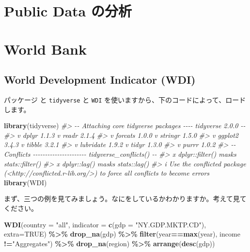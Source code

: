 \documentclass[
  xelatex, ja=standard]{bxjsbook}
\newenvironment{Shaded}{\begin{snugshade}}{\end{snugshade}}
\newcommand{\AttributeTok}[1]{\textcolor[rgb]{0.13,0.29,0.53}{#1}}
\newcommand{\CommentTok}[1]{\textcolor[rgb]{0.56,0.35,0.01}{\textit{#1}}}
\newcommand{\ConstantTok}[1]{\textcolor[rgb]{0.56,0.35,0.01}{#1}}
\newcommand{\FunctionTok}[1]{\textcolor[rgb]{0.13,0.29,0.53}{\textbf{#1}}}
\newcommand{\NormalTok}[1]{#1}
\newcommand{\SpecialCharTok}[1]{\textcolor[rgb]{0.81,0.36,0.00}{\textbf{#1}}}
\newcommand{\StringTok}[1]{\textcolor[rgb]{0.31,0.60,0.02}{#1}}
\theoremstyle{definition}
\theoremstyle{definition}
\theoremstyle{definition}
\theoremstyle{definition}
\theoremstyle{remark}
\begin{document}
\hypertarget{publicdata}{%
\chapter{Public Data の分析}\label{publicdata}}

\hypertarget{worldbank}{%
\chapter{World Bank}\label{worldbank}}

\hypertarget{world-development-indicator-wdi}{%
\section{World Development Indicator (WDI)}\label{world-development-indicator-wdi}}

パッケージ と \texttt{tidyverse} と \texttt{WDI} を使いますから、下のコードによって、ロードします。

\begin{Shaded}
\begin{Highlighting}[]
\FunctionTok{library}\NormalTok{(tidyverse)}
\CommentTok{\#\textgreater{} {-}{-} Attaching core tidyverse packages {-}{-}{-}{-} tidyverse 2.0.0 {-}{-}}
\CommentTok{\#\textgreater{} v dplyr     1.1.3     v readr     2.1.4}
\CommentTok{\#\textgreater{} v forcats   1.0.0     v stringr   1.5.0}
\CommentTok{\#\textgreater{} v ggplot2   3.4.3     v tibble    3.2.1}
\CommentTok{\#\textgreater{} v lubridate 1.9.2     v tidyr     1.3.0}
\CommentTok{\#\textgreater{} v purrr     1.0.2     }
\CommentTok{\#\textgreater{} {-}{-} Conflicts {-}{-}{-}{-}{-}{-}{-}{-}{-}{-}{-}{-}{-}{-}{-}{-}{-}{-}{-}{-}{-}{-} tidyverse\_conflicts() {-}{-}}
\CommentTok{\#\textgreater{} x dplyr::filter() masks stats::filter()}
\CommentTok{\#\textgreater{} x dplyr::lag()    masks stats::lag()}
\CommentTok{\#\textgreater{} i Use the conflicted package (\textless{}http://conflicted.r{-}lib.org/\textgreater{}) to force all conflicts to become errors}
\FunctionTok{library}\NormalTok{(WDI)}
\end{Highlighting}
\end{Shaded}

まず、三つの例を見てみましょう。なにをしているかわかりますか。考えて見てください。

\begin{Shaded}
\begin{Highlighting}[]
\FunctionTok{WDI}\NormalTok{(}\AttributeTok{country =} \StringTok{"all"}\NormalTok{, }\AttributeTok{indicator =} \FunctionTok{c}\NormalTok{(}\AttributeTok{gdp =} \StringTok{"NY.GDP.MKTP.CD"}\NormalTok{),}
    \AttributeTok{extra=}\ConstantTok{TRUE}\NormalTok{) }\SpecialCharTok{\%\textgreater{}\%} \FunctionTok{drop\_na}\NormalTok{(gdp) }\SpecialCharTok{\%\textgreater{}\%}
  \FunctionTok{filter}\NormalTok{(year}\SpecialCharTok{==}\FunctionTok{max}\NormalTok{(year), income }\SpecialCharTok{!=}\StringTok{"Aggregates"}\NormalTok{) }\SpecialCharTok{\%\textgreater{}\%} 
  \FunctionTok{drop\_na}\NormalTok{(region) }\SpecialCharTok{\%\textgreater{}\%} \FunctionTok{arrange}\NormalTok{(}\FunctionTok{desc}\NormalTok{(gdp))}
\end{Highlighting}
\end{Shaded}
\end{document}
